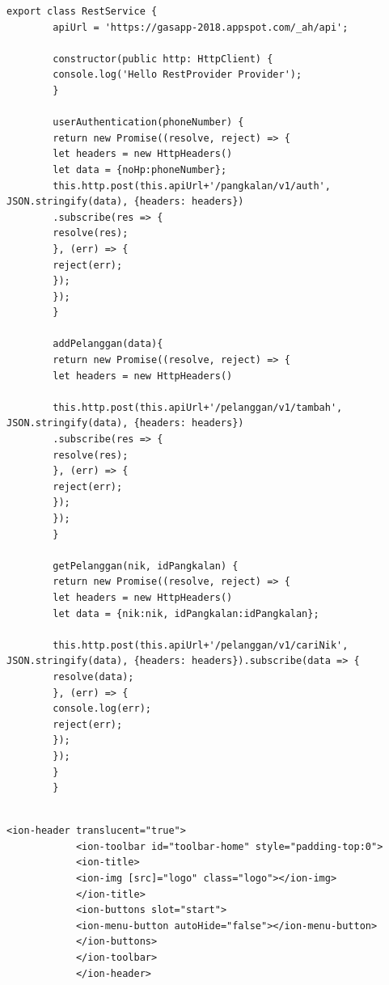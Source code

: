 \begin{enumerate}[a.]
		\vspace{-0.4cm}
		
	
		\begin{lstlisting}[caption=Potongan kode \textit{model} aplikasi berbasis android, label=modelMobile]
		export class RestService {
		apiUrl = 'https://gasapp-2018.appspot.com/_ah/api';
		
		constructor(public http: HttpClient) {
		console.log('Hello RestProvider Provider');
		}
		
		userAuthentication(phoneNumber) {
		return new Promise((resolve, reject) => {
		let headers = new HttpHeaders()
		let data = {noHp:phoneNumber};
		this.http.post(this.apiUrl+'/pangkalan/v1/auth', JSON.stringify(data), {headers: headers})
		.subscribe(res => {
		resolve(res);
		}, (err) => {
		reject(err);
		});
		});
		}
		
		addPelanggan(data){
		return new Promise((resolve, reject) => {
		let headers = new HttpHeaders()
		
		this.http.post(this.apiUrl+'/pelanggan/v1/tambah', JSON.stringify(data), {headers: headers})
		.subscribe(res => {
		resolve(res);
		}, (err) => {
		reject(err);
		});
		});
		}
		
		getPelanggan(nik, idPangkalan) {
		return new Promise((resolve, reject) => {
		let headers = new HttpHeaders()
		let data = {nik:nik, idPangkalan:idPangkalan};
		
		this.http.post(this.apiUrl+'/pelanggan/v1/cariNik', JSON.stringify(data), {headers: headers}).subscribe(data => {
		resolve(data);
		}, (err) => {
		console.log(err);
		reject(err);
		});
		});
		}
		}
		
		\end{lstlisting}
		
		\begin{lstlisting}[caption=Potongan kode \textit{view} aplikasi berbasis android, label=viewMobile]
			<ion-header translucent="true">
			<ion-toolbar id="toolbar-home" style="padding-top:0">
			<ion-title>
			<ion-img [src]="logo" class="logo"></ion-img>
			</ion-title>
			<ion-buttons slot="start">
			<ion-menu-button autoHide="false"></ion-menu-button>
			</ion-buttons>
			</ion-toolbar>
			</ion-header>
			

\end{lstlisting}
\end{enumerate}
